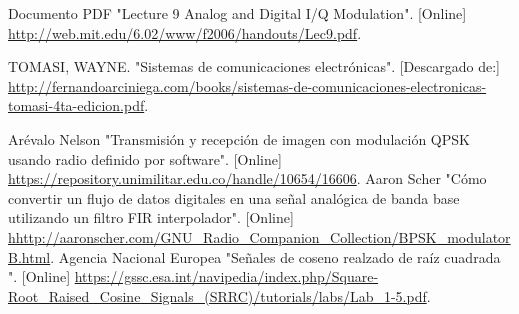 \begin{frame}[allowframebreaks]
\begin{thebibliography}{11}
 Documento PDF
\newblock "Lecture 9 Analog and Digital I/Q Modulation". [Online] \url{http://web.mit.edu/6.02/www/f2006/handouts/Lec9.pdf}.


 TOMASI, WAYNE.
\newblock "Sistemas de comunicaciones electrónicas". [Descargado de:] \url{http://fernandoarciniega.com/books/sistemas-de-comunicaciones-electronicas-tomasi-4ta-edicion.pdf}.

 Arévalo Nelson
\newblock "Transmisión y recepción de imagen con modulación QPSK usando radio definido por software". [Online] \url{https://repository.unimilitar.edu.co/handle/10654/16606}. 
 Aaron Scher 
\newblock "Cómo convertir un flujo de datos digitales en una señal analógica de banda base utilizando un filtro FIR interpolador". [Online] \url{hhttp://aaronscher.com/GNU_Radio_Companion_Collection/BPSK_modulatorB.html}. 
 Agencia Nacional Europea
\newblock "Señales de coseno realzado de raíz cuadrada ". [Online] \url{https://gssc.esa.int/navipedia/index.php/Square-Root_Raised_Cosine_Signals_(SRRC)/tutorials/labs/Lab\_1-5.pdf}. 

\end{thebibliography}


\end{frame}